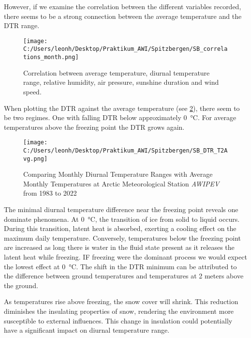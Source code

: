 However, if we examine the correlation between the different variables recorded, there seems to be a strong connection between the average temperature and the DTR range.

\begin{figure}[ht]
    \centering
    \texttt{[image: C:/Users/leonh/Desktop/Praktikum\_AWI/Spitzbergen/SB\_correlations\_month.png]}
    \caption{Correlation between average temperature, diurnal temperature range, relative humidity, air pressure, sunshine duration and wind speed.}
    \label{fi:correlationMonth_SB}
\end{figure}

When plotting the DTR against the average temperature (see \cref{fig:SB_DTR_Month_scatterd}), there seem to be two regimes. One with falling DTR below approximately 
\SI{0}{\celsius}. For average temperatures above the freezing point the DTR grows again. 

\begin{figure}[h!]
    \centering
    \texttt{[image: C:/Users/leonh/Desktop/Praktikum\_AWI/Spitzbergen/SB\_DTR\_T2Avg.png]}
    \caption{Comparing Monthly Diurnal Temperature Ranges with Average Monthly Temperatures at Arctic Meteorological Station \textit{AWIPEV} from 1983 to 2022}
    \label{fig:SB_DTR_Month_scatterd}
\end{figure}

The minimal diurnal temperature difference near the freezing point reveals one dominate
phenomena. At \SI{0}{\celsius}, the transition of ice from solid to liquid occurs. During this transition, latent heat is absorbed, exerting a cooling effect on the maximum daily temperature. Conversely, temperatures below the freezing point are increased as long there is water in the fluid state present as it releases the latent heat while freezing. IF freezing were the dominant process we would expect the lowest effect at \SI{0}{\celsius}.
The shift in the DTR minimum can be attributed to the difference between ground temperatures and temperatures at 2 meters above the ground.

As temperatures rise above freezing, the snow cover will shrink. This reduction diminishes the insulating properties of snow, rendering the environment more susceptible to external influences. This change in insulation could potentially have a significant impact on diurnal temperature range.



